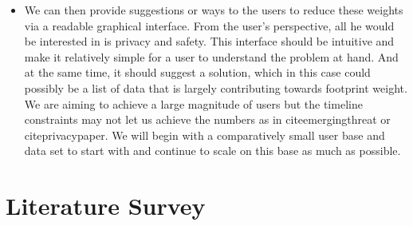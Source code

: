 \documentclass[11pt]{article}
\begin{document}
\begin{itemize}
   \item We can then provide suggestions or ways to the users to reduce these weights via a readable graphical interface. From the user’s perspective, all he would be interested in is privacy and safety. This interface should be intuitive and make it relatively simple for a user to understand the problem at hand. And at the same time, it should suggest a solution, which in this case could possibly be a list of data that is largely contributing towards footprint weight. We are aiming to achieve a large magnitude of users but the timeline constraints may not let us achieve the numbers as in cite{emergingthreat} or cite{privacypaper}. We will begin with a comparatively small user base and data set to start with and continue to scale on this base as much as possible.
   \end{itemize}

\section{Literature Survey}
\paragraph{}
\end{document}
